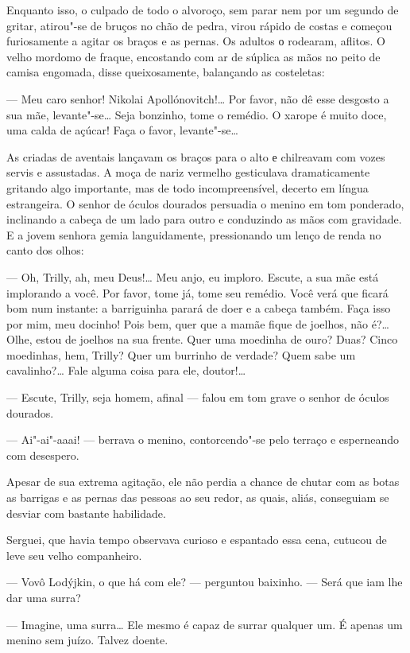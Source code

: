 Enquanto isso, o culpado de todo o alvoroço, sem parar nem por um
segundo de gritar, atirou"-se de bruços no chão de pedra, virou rápido de
costas e começou furiosamente a agitar os braços e as pernas. Os adultos
о rodearam, aflitos. O velho mordomo de fraque, encostando com ar de
súplica as mãos no peito de camisa engomada, disse queixosamente,
balançando as costeletas:

--- Meu caro senhor! Nikolai Apollónovitch!\ldots{} Por favor, não dê esse
desgosto a sua mãe, levante"-se\ldots{} Seja bonzinho, tome o remédio. O
xarope é muito doce, uma calda de açúcar! Faça o favor, levante"-se\ldots{}

As criadas de aventais lançavam os braços para o alto е chilreavam com
vozes servis e assustadas. A moça de nariz vermelho gesticulava
dramaticamente gritando algo importante, mas de todo incompreensível, decerto em língua estrangeira. O senhor de óculos
dourados persuadia o menino em tom ponderado, inclinando a cabeça de um
lado para outro e conduzindo as mãos com gravidade. E a jovem senhora
gemia languidamente, pressionando um lenço de renda no canto dos olhos:

--- Oh, Trilly, ah, meu Deus!\ldots{} Meu anjo, eu imploro. Escute, a sua mãe
está implorando a você. Por favor, tome já, tome seu remédio. Você verá
que ficará bom num instante: a barriguinha parará de doer e a cabeça
também. Faça isso por mim, meu docinho! Pois bem, quer que a mamãe fique
de joelhos, não é?\ldots{} Olhe, estou de joelhos na sua frente. Quer uma
moedinha de ouro? Duas? Cinco moedinhas, hem, Trilly? Quer um burrinho
de verdade? Quem sabe um cavalinho?\ldots{} Fale alguma coisa para ele,
doutor!\ldots{}

--- Escute, Trilly, seja homem, afinal --- falou em tom grave o senhor
de óculos dourados.

--- Ai"-ai"-aaai! --- berrava o menino, contorcendo"-se pelo terraço e
esperneando com desespero.

Apesar de sua extrema agitação, ele não perdia a chance de chutar com as
botas as barrigas e as pernas das pessoas ao seu redor, as quais, aliás,
conseguiam se desviar com bastante habilidade.

Serguei, que havia tempo observava curioso e espantado essa cena,
cutucou de leve seu velho companheiro.

--- Vovô Lodýjkin, o que há com ele? --- perguntou baixinho. --- Será
que iam lhe dar uma surra?

--- Imagine, uma surra\ldots{} Ele mesmo é capaz de surrar qualquer um. É
apenas um menino sem juízo. Talvez doente.

